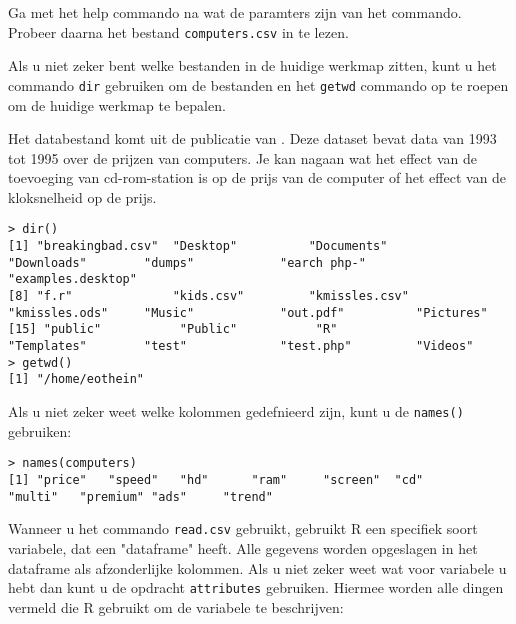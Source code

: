 \begin{exercise}
	Ga met het help commando na wat de paramters zijn van het commando. Probeer daarna het bestand \texttt{computers.csv} in te lezen. 
\end{exercise}

Als u niet zeker bent welke bestanden in de huidige werkmap zitten, kunt u het commando \texttt{dir}  gebruiken om de bestanden en het  \texttt{getwd} commando op te roepen om de huidige werkmap te bepalen.

Het databestand komt uit de publicatie van \autocite{Stengos2005}. Deze dataset bevat data van 1993 tot 1995 over de prijzen van computers. Je kan nagaan wat het effect van de toevoeging van cd-rom-station is op de prijs van de computer of  het effect van de kloksnelheid op de prijs. 

\begin{lstlisting}
> dir()
[1] "breakingbad.csv"  "Desktop"          "Documents"        "Downloads"        "dumps"            "earch php-"       "examples.desktop"
[8] "f.r"              "kids.csv"         "kmissles.csv"     "kmissles.ods"     "Music"            "out.pdf"          "Pictures"        
[15] "public"           "Public"           "R"                "Templates"        "test"             "test.php"         "Videos"          
> getwd()
[1] "/home/eothein"
\end{lstlisting}
Als u niet zeker weet welke kolommen gedefnieerd zijn, kunt u de \texttt{names()} gebruiken:


\begin{lstlisting}
> names(computers)
[1] "price"   "speed"   "hd"      "ram"     "screen"  "cd"      "multi"   "premium" "ads"     "trend"
\end{lstlisting}

 Wanneer u het commando \texttt{read.csv} gebruikt, gebruikt R een specifiek soort variabele, dat een "dataframe" heeft. Alle gegevens worden opgeslagen in het dataframe als afzonderlijke kolommen. Als u niet zeker weet wat voor variabele u hebt dan kunt u de opdracht \texttt{attributes} gebruiken. Hiermee worden alle dingen vermeld die R gebruikt om de variabele te beschrijven:

